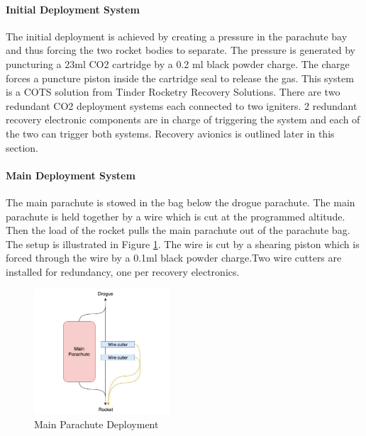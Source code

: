 \paragraph{Initial Deployment System}
\hfill \break
The initial deployment is achieved by creating a pressure in the parachute bay and thus forcing the two rocket bodies to separate. The pressure is generated by puncturing a 23ml CO2 cartridge by a 0.2 ml black powder charge. The charge forces a puncture piston inside the cartridge seal to release the gas. This system is a COTS solution from Tinder Rocketry Recovery Solutions.
There are two redundant CO2 deployment systems each connected to two igniters. 2 redundant recovery electronic components are in charge of triggering the system and each of the two can trigger both systems. Recovery avionics is outlined later in this section.

\paragraph{Main Deployment System}
\hfill \break
The main parachute is stowed in the bag below the drogue parachute. The main parachute is held together by a wire which is cut at the programmed altitude. Then the load of the rocket pulls the main parachute out of the parachute bag. The setup is illustrated in Figure \ref{f:recovery_main_deployment}. The wire is cut by a shearing piston which is forced through the wire by a 0.1ml black powder charge.Two wire cutters are installed for redundancy, one per recovery electronics.

\begin{figure}[h!]
 	\centering
        \includegraphics[width=0.45\textwidth]{img/recovery_main_deployment.jpg}
        \caption{Main Parachute Deployment}
        \label{f:recovery_main_deployment}
 \end{figure}

